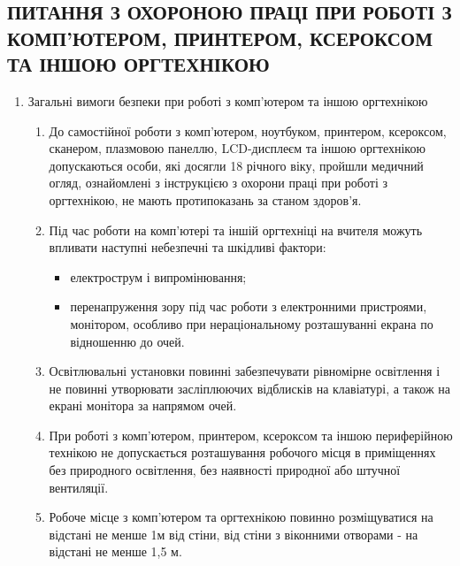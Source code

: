 \renewcommand{\theenumi}{\arabic{enumi}}
\renewcommand{\labelenumi}{\theenumi.}
\renewcommand{\theenumii}{\arabic{enumi}.\arabic{enumii}}
\renewcommand{\labelenumii}{\theenumii.}

\begin{center}
    \section*{\bfseries\MakeUppercase{Питання з охороною праці при роботі з комп'ютером, принтером, ксероксом та іншою оргтехнікою}}
\end{center}

\begin{enumerate}
    \item Загальні вимоги безпеки при роботі з комп'ютером та іншою оргтехнікою
    \begin{enumerate}
        \item До самостійної роботи з комп'ютером, ноутбуком, принтером, ксероксом, сканером, плазмовою панеллю, LCD-дисплеєм та іншою оргтехнікою допускаються особи, які досягли 18 річного віку, пройшли медичний огляд, ознайомлені з інструкцією з охорони праці при роботі з оргтехнікою, не мають протипоказань за станом здоров'я.
        \item Під час роботи на комп'ютері та іншій оргтехніці на вчителя можуть впливати наступні небезпечні та шкідливі фактори:
        \begin{itemize}
            \item електрострум і випромінювання;
            \item перенапруження зору під час роботи з електронними пристроями, монітором, особливо при нераціональному розташуванні екрана по відношенню до очей.
        \end{itemize}
        \item Освітлювальні установки повинні забезпечувати рівномірне освітлення і не повинні утворювати засліплюючих відблисків на клавіатурі, а також на екрані монітора за напрямом очей.
        \item При роботі з комп'ютером, принтером, ксероксом та іншою периферійною технікою не допускається розташування робочого місця в приміщеннях без природного освітлення, без наявності природної або штучної вентиляції.
        \item Робоче місце з комп'ютером та оргтехнікою повинно розміщуватися на відстані не менше 1м від стіни, від стіни з віконними отворами - на відстані не менше 1,5 м.

\end{enumerate}
\end{enumerate}
